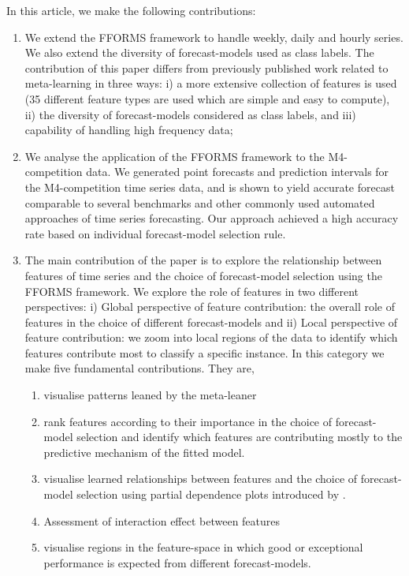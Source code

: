 \documentclass[11pt,a4paper,]{article}
\providecommand{\tightlist}{%
  \setlength{\itemsep}{0pt}\setlength{\parskip}{0pt}}
\begin{document}
In this article, we make the following contributions:

\begin{enumerate}
\def\labelenumi{\arabic{enumi}.}
\tightlist
\item
  We extend the FFORMS framework to handle weekly, daily and hourly
  series. We also extend the diversity of forecast-models used as class
  labels. The contribution of this paper differs from previously
  published work related to meta-learning
  \autocites{prudencio2004meta}{lemke2010meta}{kuck2016meta} in three
  ways: i) a more extensive collection of features is used (35 different
  feature types are used which are simple and easy to compute), ii) the
  diversity of forecast-models considered as class labels, and iii)
  capability of handling high frequency data;
\item
  We analyse the application of the FFORMS framework to the
  M4-competition data. We generated point forecasts and prediction
  intervals for the M4-competition time series data, and is shown to
  yield accurate forecast comparable to several benchmarks and other
  commonly used automated approaches of time series forecasting. Our
  approach achieved a high accuracy rate based on individual
  forecast-model selection rule.
\item
  The main contribution of the paper is to explore the relationship
  between features of time series and the choice of forecast-model
  selection using the FFORMS framework. We explore the role of features
  in two different perspectives: i) Global perspective of feature
  contribution: the overall role of features in the choice of different
  forecast-models and ii) Local perspective of feature contribution: we
  zoom into local regions of the data to identify which features
  contribute most to classify a specific instance. In this category we
  make five fundamental contributions. They are,

  \begin{enumerate}
  \def\labelenumii{\roman{enumii})}
  \tightlist
  \item
    visualise patterns leaned by the meta-leaner
  \item
    rank features according to their importance in the choice of
    forecast-model selection and identify which features are
    contributing mostly to the predictive mechanism of the fitted model.
  \item
    visualise learned relationships between features and the choice of
    forecast-model selection using partial dependence plots introduced
    by \textcite{friedman2008predictive}.
  \item
    Assessment of interaction effect between features
  \item
    visualise regions in the feature-space in which good or exceptional
    performance is expected from different forecast-models.
  \end{enumerate}
\end{enumerate}
\end{document}
